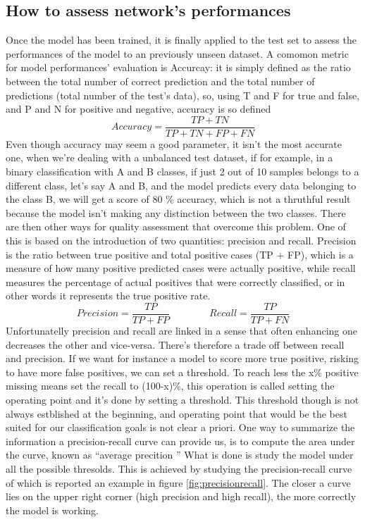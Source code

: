 \documentclass[a4paper,11pt]{article}
\begin{document}
\subsection{How to assess network's performances}
Once the model has been trained, it is finally applied to the test set to assess the performances of the model to an previously unseen dataset.
A comomon metric for model performances' evaluation is Accurcay: it is simply defined as the ratio between the total number of correct prediction and the total number of predictions (total number of the test's data), so, using T and F for true and false, and P and N for positive and negative, accuracy is so defined
\begin{equation}
Accuracy = \frac{TP + TN}{TP+TN+FP+FN}
\end{equation}
Even though accuracy may seem a good parameter, it isn't the most accurate one, when we're dealing with a unbalanced test dataset, if for example, in a binary classification with A and B classes, if just 2 out of 10 samples belongs to a different class, let's say A and B, and the model predicts every data belonging to the class B, we will get a score of 80 \% accuracy, which is not a thruthful result because the model isn't making any distinction between the two classes.
There are then other ways for quality assessment that overcome this problem. One of this is based on the introduction of two quantities: precision and recall.
Precision is the ratio between true positive and total positive cases (TP + FP), which is a measure of how many positive predicted cases were actually positive, while recall measures the percentage of actual positives that were correctly classified, or in other words it represents the true positive rate.
\begin{equation}
Precision = \frac{TP}{TP+FP} \qquad \qquad Recall = \frac{TP}{TP+FN}
\end{equation}
Unfortunatelly precision and recall are linked in a sense that often enhancing one decreases the other and vice-versa.
There's therefore a trade off between recall and precision. If we want for instance a model to score more true positive, risking to have more false positives, we can set a threshold.
To reach less the x\% positive missing means set the recall to (100-x)\%, this operation is called setting the operating point and it's done by setting a threshold.
This threshold though is not always estblished at the beginning, and operating point that would be the best suited for our classification goals is not clear a priori.
One way to summarize the information a precision-recall curve can provide us, is to compute the area under the curve, known as \textquotedblleft average precition \textquotedblright
What is done is study the model under all the possible thresolds.
This is achieved by studying the precision-recall curve of which is reported an example in figure \ref{fig:precisionrecall}.
The closer a curve lies on the upper right corner (high precision and high recall), the more correctly the model is working.
\end{document}
